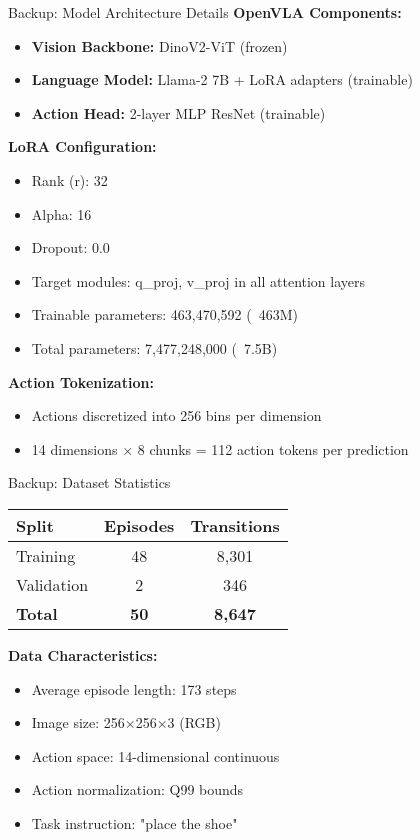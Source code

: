 \documentclass[aspectratio=169]{beamer}
\begin{document}
\begin{frame}{Backup: Model Architecture Details}
\textbf{OpenVLA Components:}
\begin{itemize}
    \item \textbf{Vision Backbone:} DinoV2-ViT (frozen)
    \item \textbf{Language Model:} Llama-2 7B + LoRA adapters (trainable)
    \item \textbf{Action Head:} 2-layer MLP ResNet (trainable)
\end{itemize}

\vspace{0.3cm}
\textbf{LoRA Configuration:}
\begin{itemize}
    \item Rank (r): 32
    \item Alpha: 16
    \item Dropout: 0.0
    \item Target modules: q\_proj, v\_proj in all attention layers
    \item Trainable parameters: 463,470,592 (~463M)
    \item Total parameters: 7,477,248,000 (~7.5B)
\end{itemize}

\vspace{0.3cm}
\textbf{Action Tokenization:}
\begin{itemize}
    \item Actions discretized into 256 bins per dimension
    \item 14 dimensions × 8 chunks = 112 action tokens per prediction
\end{itemize}
\end{frame}

\begin{frame}{Backup: Dataset Statistics}
\begin{table}
\centering
\begin{tabular}{lcc}
\toprule
\textbf{Split} & \textbf{Episodes} & \textbf{Transitions} \\
\midrule
Training & 48 & 8,301 \\
Validation & 2 & 346 \\
\textbf{Total} & \textbf{50} & \textbf{8,647} \\
\bottomrule
\end{tabular}
\end{table}

\vspace{0.3cm}
\textbf{Data Characteristics:}
\begin{itemize}
    \item Average episode length: 173 steps
    \item Image size: 256×256×3 (RGB)
    \item Action space: 14-dimensional continuous
    \item Action normalization: Q99 bounds
    \item Task instruction: "place the shoe"
\end{itemize}
\end{frame}
\end{document}
